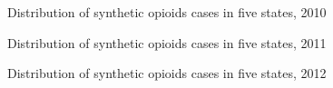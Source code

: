 \documentclass{mcmthesis}
\numberwithin{equation}{section}
\numberwithin{figure}{section}
\numberwithin{table}{section}
\theoremstyle{mydef}
\begin{document}
\begin{appendices}
\begin{figure}[H]
  \caption{Distribution of synthetic opioids cases in five states, 2010}
  \label{figop10}
\end{figure}
\begin{figure}[H]
  \caption{Distribution of synthetic opioids cases in five states, 2011}
  \label{figop11}
\end{figure}
\begin{figure}[H]
  \caption{Distribution of synthetic opioids cases in five states, 2012}

\end{figure}
\end{appendices}
\end{document}
